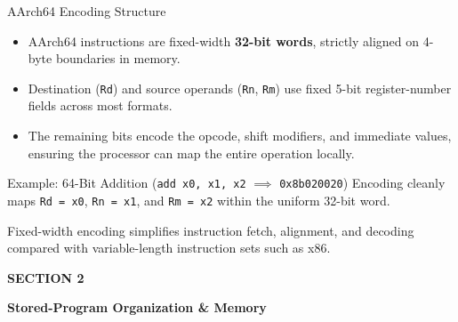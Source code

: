 \documentclass[aspectratio=169,11pt,t]{beamer}
\newcommand{\key}[1]{\textbf{#1}}
\newcommand{\code}[1]{\texttt{#1}}
\begin{document}
\begin{frame}{AArch64 Encoding Structure}

\begin{itemize}\setlength{\itemsep}{5pt}
  \item AArch64 instructions are fixed-width \key{32-bit words}, strictly aligned on 4-byte boundaries in memory.
  \item Destination (\code{Rd}) and source operands (\code{Rn}, \code{Rm}) use fixed 5-bit register-number fields across most formats.
  \item The remaining bits encode the opcode, shift modifiers, and immediate values, ensuring the processor can map the entire operation locally.
\end{itemize}

\vfill

\begin{block}{
Example: 64-Bit Addition
(\texttt{add x0, x1, x2} $\implies$ \texttt{0x8b020020})
}
\centering
\small
Encoding cleanly maps \code{Rd = x0}, \code{Rn = x1}, and \code{Rm = x2}
within the uniform 32-bit word.
\end{block}

\vfill

Fixed-width encoding simplifies instruction fetch, alignment, and decoding compared with variable-length instruction sets such as x86.

\end{frame}







\begin{frame}[plain]


\vspace*{\fill}

\begin{minipage}{0.94\textwidth}
\raggedright
{}

{\color{gold}\large\bfseries SECTION 2\par}

\vspace{0.3cm}

{\color{white}\fontsize{22}{26}\selectfont\bfseries
Stored-Program Organization \& Memory\par}

\end{minipage}

\vspace*{\fill}

\end{frame}
\end{document}
